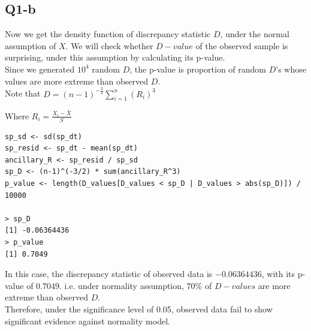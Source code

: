 \documentclass[11pt,letterpaper]{article}
\begin{document}
\subsection*{Q1-b}
\noindent Now we get the density function of discrepancy statistic $D$, under the normal assumption of $X$. We will check whether $D-value$ of the observed sample is surprising, under this assumption by calculating its p-value. \\

\noindent Since we generated $10^4$ random $D$, the p-value is proportion of random $D$'s whose values are more extreme than observed $D$. \\

\noindent Note that $D = (n-1)^{-\frac{3}{2}} \sum_{i=1}^{n} (R_i)^3$

\noindent Where $R_i = \frac{X_i - \bar{X}}{S}$

\begin{verbatim}
sp_sd <- sd(sp_dt)
sp_resid <- sp_dt - mean(sp_dt)
ancillary_R <- sp_resid / sp_sd
sp_D <- (n-1)^(-3/2) * sum(ancillary_R^3)
p_value <- length(D_values[D_values < sp_D | D_values > abs(sp_D)]) / 10000

> sp_D
[1] -0.06364436
> p_value
[1] 0.7049
\end{verbatim}

\noindent In this case, the discrepancy statistic of observed data is $-0.06364436$, with its p-value of $0.7049$. i.e. under normality assumption, $70 \%$ of $D-values$ are more extreme than observed $D$. \\

\noindent Therefore, under the significance level of 0.05, observed data fail to show significant evidence against normality model. 
\end{document}
